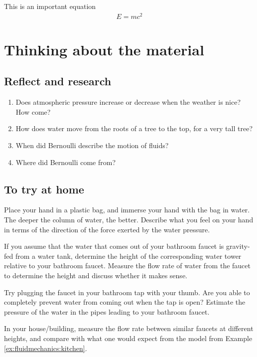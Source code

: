 {{\begin{chapterSummary}
\end{chapterSummary}

\newpage
\begin{importantEquations}
This is an important equation
\begin{align*}
E = mc^2
\end{align*}

\end{importantEquations}


\newpage
\section{Thinking about the material}
\subsection{Reflect and research}

\begin{enumerate}
\item Does atmospheric pressure increase or decrease when the weather is nice? How come?
\item How does water move from the roots of a tree to the top, for a very tall tree?
\item When did Bernoulli describe the motion of fluids?
\item Where did Bernoulli come from?
\end{enumerate}
\subsection{To try at home}
Place your hand in a plastic bag, and immerse your hand with the bag in water. The deeper the column of water, the better. Describe what you feel on your hand in terms of the direction of the force exerted by the water pressure.

If you assume that the water that comes out of your bathroom faucet is gravity-fed from a water tank, determine the height of the corresponding water tower relative to your bathroom faucet. Measure the flow rate of water from the faucet to determine the height and discuss whether it makes sense. 

Try plugging the faucet in your bathroom tap with your thumb. Are you able to completely prevent water from coming out when the tap is open? Estimate the pressure of the water in the pipes leading to your bathroom faucet.

In your house/building, measure the flow rate between similar faucets at different heights, and compare with what one would expect from the model from Example \ref{ex:fluidmechanics:kitchen}.

}}
